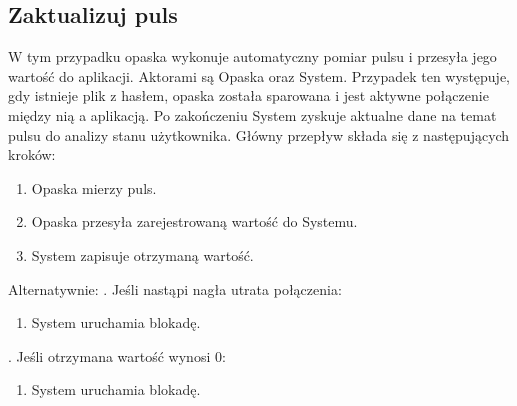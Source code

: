\subsection{Zaktualizuj puls}
W tym przypadku opaska wykonuje automatyczny pomiar pulsu i przesyła jego wartość do aplikacji. Aktorami są Opaska oraz System. Przypadek ten występuje, gdy istnieje plik z hasłem, opaska została sparowana i jest aktywne połączenie między nią a aplikacją. Po zakończeniu System zyskuje aktualne dane na temat pulsu do analizy stanu użytkownika. Główny przepływ składa się z następujących kroków:
\begin{enumerate}
    \item Opaska mierzy puls.
    \item Opaska przesyła zarejestrowaną wartość do Systemu.
    \item System zapisuje otrzymaną wartość.
\end{enumerate}
Alternatywnie:
\newline\newline
{}. Jeśli nastąpi nagła utrata połączenia:
\begin{enumerate}[leftmargin=3\parindent]
    \item System uruchamia blokadę.
\end{enumerate}
\quad\newline
{}. Jeśli otrzymana wartość wynosi 0:
\begin{enumerate}[leftmargin=3\parindent]
    \item System uruchamia blokadę.
\end{enumerate}

